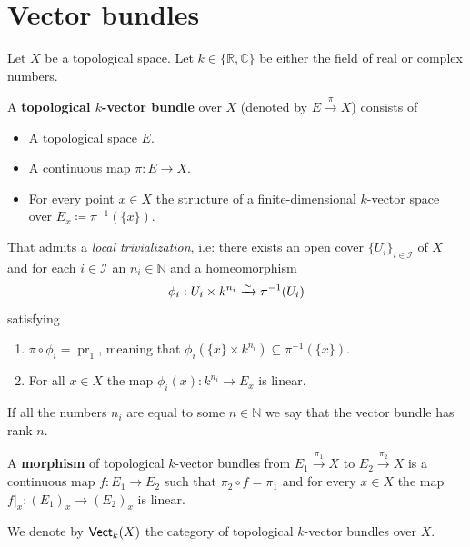 \documentclass[../../../main]{subfiles}
\begin{document}
\section{Vector bundles} \label{sec:vector-bundles}

\begin{definition} \label{def:topological-vector-bundle}
  Let \(X\) be a topological space.
  Let \(k \in \{\mathbb{R}, \mathbb{C}\}\) be either the field of real or complex numbers.
 
  A \textbf{topological \(k\)-vector bundle} over \(X\) (denoted by \(E \xrightarrow{\pi} X\)) consists of
  \begin{itemize}
    \item A topological space \(E\).
    \item A continuous map \(\pi: E \to X\).
    \item For every point \(x \in X\) the structure of a finite-dimensional \(k\)-vector space over \(E_{x} \coloneq \pi^{-1}(\{x\})\).
  \end{itemize}
  That admits a \textit{local trivialization}, i.e: there exists an open cover \(\{U_{i}\}_{i \in \mathcal{I}}\) of \(X\) and for each \(i \in \mathcal{I}\) an \(n_{i} \in \mathbb{N}\) and a homeomorphism
  \begin{equation*}
    \phi_{i}: U_{i} \times k^{n_{i}} \xrightarrow{\sim} \pi^{-1}(U_{i})
  \end{equation*}
  satisfying
  \begin{enumerate}
    \item \(\pi \circ \phi_{i} = \operatorname{pr}_{1}\), meaning that \(\phi_{i}(\{x\} \times k^{n_{i}}) \subseteq \pi^{-1}(\{x\})\).
    \item For all \(x \in X\) the map \(\phi_{i}(x): k^{n_{i}} \to E_{x}\) is linear.
  \end{enumerate}
  If all the numbers \(n_{i}\) are equal to some \(n \in \mathbb{N}\) we say that the vector bundle has rank \(n\).
  
  A \textbf{morphism} of topological \(k\)-vector bundles from \(E_{1} \xrightarrow{\pi_{1}} X\) to \(E_{2} \xrightarrow{\pi_{2}} X\) is a continuous map \(f: E_{1} \to E_{2}\) such that \(\pi_{2} \circ f = \pi_{1}\) and for every \(x \in X\) the map \(f|_{x}: (E_{1})_{x} \to (E_{2})_{x}\) is linear.

  We denote by \(\mathsf{Vect}_{k}(X)\) the category of topological \(k\)-vector bundles over \(X\).
\end{definition}
\end{document}
